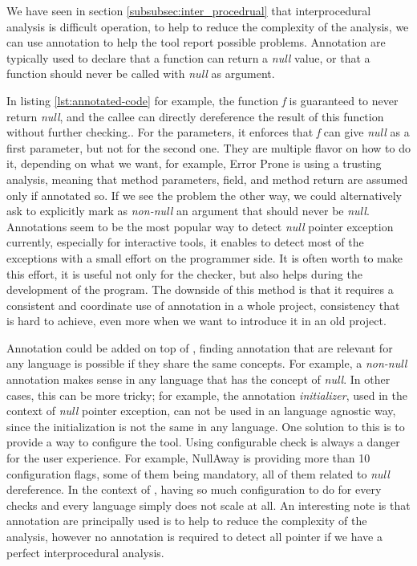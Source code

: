 We have seen in section \ref{subsubsec:inter_procedrual} that interprocedural analysis is difficult operation, to help to reduce the complexity of the analysis, we can use annotation to help the tool report possible problems. 
Annotation are typically used to declare that a function can return a \emph{null} value, or that a function should never be called with \emph{null} as argument.



In listing \ref{lst:annotated-code} for example, the function \emph{f} is guaranteed to never return \emph{null}, and the callee can directly dereference the result of this function without further checking..
For the parameters, it enforces that \emph{f} can give \emph{null} as a first parameter, but not for the second one.\newline
They are multiple flavor on how to do it, depending on what we want, for example, Error Prone is using a trusting analysis, meaning that method parameters, field, and method return are assumed \nullable{} only if annotated so. 
If we see the problem the other way, we could alternatively ask to explicitly mark as \emph{non-null} an argument that should never be \emph{null}.\newline
Annotations seem to be the most popular way to detect \emph{null} pointer exception currently, especially for interactive tools, it enables to detect most of the exceptions with a small effort on the programmer side. 
It is often worth to make this effort, it is useful not only for the checker, but also helps during the development of the program.
The downside of this method is that it requires a consistent and coordinate use of annotation in a whole project, consistency that is hard to achieve, even more when we want to introduce it in an old project.

Annotation could be added on top of \slang{}, finding annotation that are relevant for any language is possible if they share the same concepts. 
For example, a \emph{non-null} annotation makes sense in any language that has the concept of \emph{null}. 
In other cases, this can be more tricky; for example, the annotation \emph{initializer}, used in the context of \emph{null} pointer exception, can not be used in an language agnostic way, since the initialization is not the same in any language.\newline
One solution to this is to provide a way to configure the tool. 
Using configurable check is always a danger for the user experience. For example, NullAway is providing more than 10 configuration flags, some of them being mandatory, all of them related to \emph{null} dereference. 
In the context of \slang{}, having so much configuration to do for every checks and every language simply does not scale at all.\newline
An interesting note is that annotation are principally used is to help to reduce the complexity of the analysis, however no annotation is required to detect all pointer if we have a perfect interprocedural analysis.

